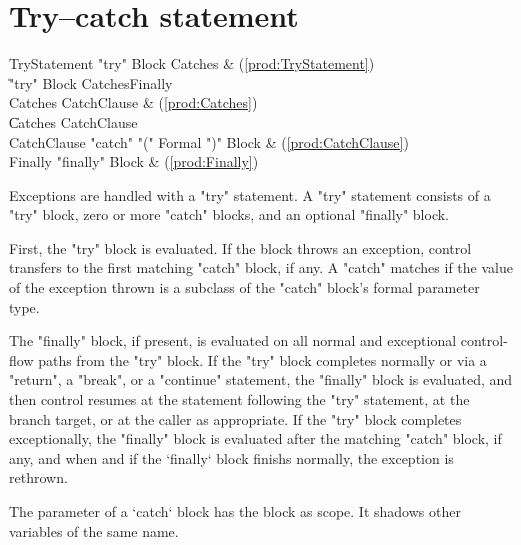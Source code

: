 \section{Try--catch statement}

\begin{bbgrammar}
        TryStatement \: \xcd"try" Block Catches & (\ref{prod:TryStatement}) \\
                     \| \xcd"try" Block Catches\opt Finally \\
             Catches \: CatchClause & (\ref{prod:Catches}) \\
                     \| Catches CatchClause \\
         CatchClause \: \xcd"catch" \xcd"(" Formal \xcd")" Block & (\ref{prod:CatchClause}) \\
             Finally \: \xcd"finally" Block & (\ref{prod:Finally}) \\
\end{bbgrammar}

Exceptions are handled with a \xcd"try" statement.
A \xcd"try" statement consists of a \xcd"try" block, zero or more
\xcd"catch" blocks, and an optional \xcd"finally" block.

First, the \xcd"try" block is evaluated.  If the block throws an
exception, control transfers to the first matching \xcd"catch"
block, if any.  A \xcd"catch" matches if the value of the
exception thrown is a subclass of the \xcd"catch" block's formal
parameter type.

The \xcd"finally" block, if present, is evaluated on all normal
and exceptional control-flow paths from the \xcd"try" block.
If the \xcd"try" block completes normally
or via a \xcd"return", a \xcd"break", or a
\xcd"continue" statement, 
the \xcd"finally"
block is evaluated, and then control resumes at
the statement following the \xcd"try" statement, at the branch target, or at
the caller as appropriate.
If the \xcd"try" block completes
exceptionally, the \xcd"finally" block is evaluated after the
matching \xcd"catch" block, if any, and when and if the \xcd`finally` block
finishs normally, the
exception is rethrown.


The parameter of a \xcd`catch` block has the block as scope.  It shadows other
variables of the same name.


